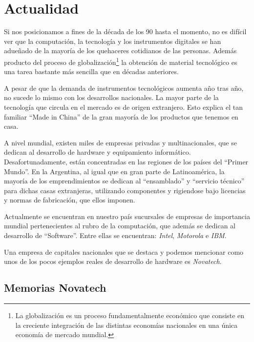 \documentclass[%
 	final,
%
	notitlepage,
	narroweqnarray,
	inline,
 	twoside,
	]{ieee}
\begin{document}
\section{Actualidad}

Si nos posicionamos a fines de la d\'ecada de los 90 hasta el momento, no es dif\'icil ver que la computaci\'on, la tecnolog\'ia y los instrumentos digitales se han adue\~nado de la mayor\'ia de los quehaceres cotidianos de las personas. Adem\'as producto del proceso de globalizaci\'on\footnote{La globalizaci\'on es un proceso fundamentalmente econ\'omico que consiste en la creciente integraci\'on de las distintas econom\'ias nacionales en una \'unica econom\'ia de mercado mundial.} la obtenci\'on de material tecnol\'ogico es una tarea bastante m\'as sencilla que en d\'ecadas anteriores.

A pesar de que la demanda de instrumentos tecnol\'ogicos aumenta a\~no tras a\~no, no sucede lo mismo con los desarrollos nacionales. La mayor parte de la tecnolog\'ia que circula en el mercado es de origen extranjero. Esto explica el tan familiar ``Made in China'' de la gran mayor\'ia de los productos que tenemos en casa.

A nivel mundial, existen miles de empresas privadas y multinacionales, que se dedican al desarrollo de hardware y equipamiento inform\'atico. Desafortunadamente, est\'an concentradas en las regiones de los pa\'ises del ``Primer Mundo''. En la Argentina, al igual que en gran parte de Latinoam\'erica, la mayor\'ia de los emprendimientos se dedican al ``ensamblado'' y ``servicio t\'ecnico'' para dichas casas extranjeras, utilizando componentes y rigiendose bajo licencias y normas de fabricaci\'on, que ellos imponen.

Actualmente se encuentran en nuestro pa\'is sucursales de empresas de importancia mundial pertenecientes al rubro de la computaci\'on, que adem\'as se dedican al desarrollo de ``Software''. Entre ellas se encuentran: \textit{Intel}, \textit{Motorola} e \textit{IBM}.

Una empresa de capitales nacionales que se destaca y podemos mencionar como unos de los pocos ejemplos reales de desarrollo de hardware es \textit{Novatech}.

\subsection*{Memorias Novatech}
\end{document}
